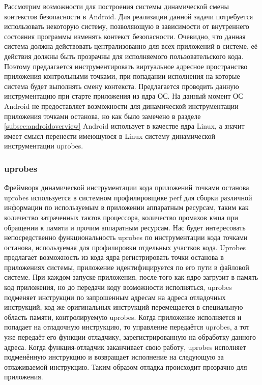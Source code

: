 Рассмотрим возможности для построения системы динамической смены
контекстов безопасности в Android. Для реализации данной задачи
потребуется использовать некоторую систему, позволяющую в зависимости от
внутреннего состояния программы изменять контекст безопасности.
Очевидно, что данная система должна действовать централизованно для всех
приложений в системе, её действия должны быть прозрачны для исполняемого
пользовательского кода. Поэтому предлагается инструментировать
виртуальное адресное пространство приложения контрольными точками, при
попадании исполнения на которые система будет выполнять смену контекста.
Предлагается проводить данную инструментацию при старте приложения из
ядра ОС. На данный момент ОС Android не предоставляет возможности для
динамической инструментации приложения точками останова, но как было
замечено в разделе \ref{subsec:androidoverview} Android использует в
качестве ядра Linux, а значит имеет смысл перенести имеющуюся в Linux
систему динамической инструментации uprobes. 

\subsubsection{uprobes}

Фреймворк динамической инструментации кода приложений точками останова
uprobes используется в системном профилировщике perf для сборки
различной информации по используемым в приложении аппаратным ресурсам,
таким как количество затраченных тактов процессора, количество промахов
кэша при обращении к памяти и прочим аппаратным ресурсам. Нас будет
интересовать непосредственно функциональность uprobes по инструментации
кода точками останова, используемая для профилировки отдельных участков
кода. Uprobes предлагает возможность из кода ядра регистрировать точки
останова в приложениях системы, приложение идентифицируется по его пути
в файловой системе. При каждом запуске приложения, после того как ядро
загрузит в память код приложения, но до передачи коду возможности
исполняться, uprobes подменяет инструкции по запрошенным адресам на
адреса отладочных инструкций, код же оригинальных инструкций
перемещается в специальную область памяти, контролируемую uprobes. Когда
приложение исполняется и попадает на отладочную инструкцию, то
управление передаётся uprobes, а тот уже передаёт его функции-отладчику,
зарегистрированную на обработку данного адреса. Когда функция-отладчик
заканчивает свою работу, uprobes исполняет подменённую инструкцию и
возвращает исполнение на следующую за отлаживаемой инструкцию. Таким
образом отладка происходит прозрачно для приложения.

